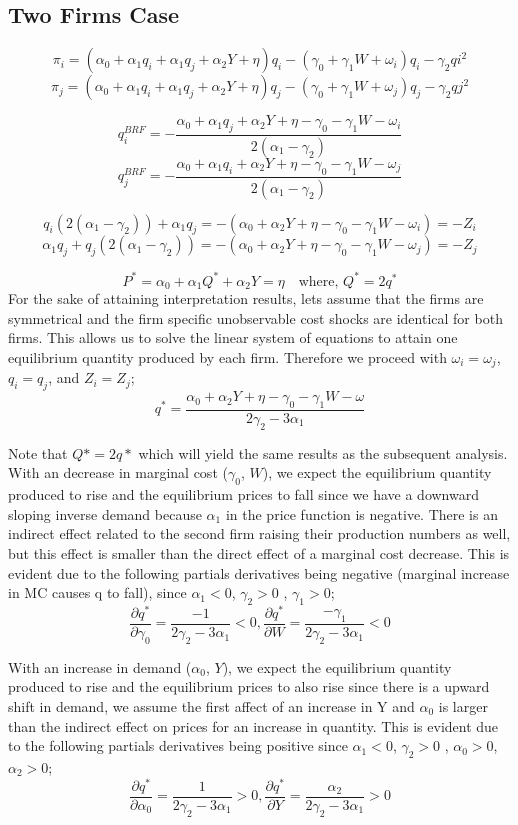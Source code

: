 \documentclass[12pt]{article}
\begin{document}
\subsection{Two Firms Case}
$$ \pi_i = (\alpha_0 + \alpha_1 q_i + \alpha_1 q_j + \alpha_2 Y + \eta)q_i - (\gamma_0 + \gamma_1W + \omega_i)q_i - \gamma_2 qi^2$$
$$ \pi_j = (\alpha_0 + \alpha_1 q_i + \alpha_1 q_j + \alpha_2 Y + \eta)q_j - (\gamma_0 + \gamma_1W + \omega_j)q_j - \gamma_2 qj^2$$

$$q_i^{BRF} =  - \frac{\alpha_0 + \alpha_1 q_j + \alpha_2 Y + \eta - \gamma_0 - \gamma_1W - \omega_i}{2(\alpha_1 - \gamma_2)} $$
$$q_j^{BRF} =  - \frac{\alpha_0 + \alpha_1 q_i + \alpha_2 Y + \eta - \gamma_0 - \gamma_1W - \omega_j}{2(\alpha_1 - \gamma_2)} $$

$$q_i (2(\alpha_1 - \gamma_2)) + \alpha_1 q_j = 
- (\alpha_0 + \alpha_2 Y + \eta - \gamma_0 - \gamma_1W - \omega_i) = - Z_i$$
$$\alpha_1 q_j + q_j (2(\alpha_1 - \gamma_2)) = 
- (\alpha_0 + \alpha_2 Y + \eta - \gamma_0 - \gamma_1W - \omega_j) = - Z_j$$

$$P^* = \alpha_0 + \alpha_1 Q^* + \alpha_2 Y = \eta \quad \text{where, } Q^* = 2q^*$$
$$ $$
For the sake of attaining interpretation results, lets assume that the firms are symmetrical and the firm specific unobservable cost shocks are identical for both firms. This allows us to solve the linear system of equations to attain one equilibrium quantity produced by each firm. Therefore we proceed with $\omega_i = \omega_j$, $q_i = q_j$, and $Z_i = Z_j$;
$$q^* = \frac{\alpha_0 + \alpha_2 Y + \eta - \gamma_0 - \gamma_1W - \omega}{2\gamma_2 - 3\alpha_1}$$

Note that $Q* = 2q*$ which will yield the same results as the subsequent analysis. With an decrease in marginal cost ($\gamma_0$, $W$), we expect the equilibrium quantity produced to rise and the equilibrium prices to fall since we have a downward sloping inverse demand because $\alpha_1$ in the price function is negative. There is an indirect effect related to the second firm raising their production numbers as well, but this effect is smaller than the direct effect of a marginal cost decrease. This is evident due to the following partials derivatives being negative (marginal increase in MC causes q to fall), since $\alpha_1 < 0$, $\gamma_2 > 0$ , $\gamma_1 > 0$;
$$\frac{\partial q^*}{\partial \gamma_0} = \frac{-1}{2\gamma_2 - 3\alpha_1}< 0 
, \frac{\partial q^*}{\partial W}  = \frac{-\gamma_1}{2\gamma_2 - 3\alpha_1}< 0$$

With an increase in demand ($\alpha_0$, $Y$), we expect the equilibrium quantity produced to rise and the equilibrium prices to also rise since there is a upward shift in demand, we assume the first affect of an increase in Y and $\alpha_0$ is larger than the indirect effect on prices for an increase in quantity. This is evident due to the following partials derivatives being positive since $\alpha_1 < 0$, $\gamma_2 > 0$ , $\alpha_0 > 0$, $\alpha_2 > 0$;
$$\frac{\partial q^*}{\partial \alpha_0} = \frac{1}{2\gamma_2 - 3\alpha_1} > 0 
, \frac{\partial q^*}{\partial Y}  = \frac{\alpha_2}{2\gamma_2 - 3\alpha_1} > 0$$
\end{document}
